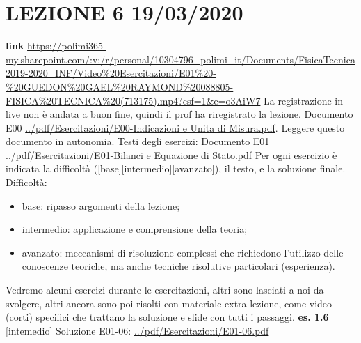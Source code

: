 \section*{LEZIONE 6 19/03/2020}
\textbf{link} \url{https://polimi365-my.sharepoint.com/:v:/r/personal/10304796_polimi_it/Documents/FisicaTecnica2019-2020_INF/Video%20Esercitazioni/E01%20-%20GUEDON%20GAEL%20RAYMOND%20088805-FISICA%20TECNICA%20(713175).mp4?csf=1&e=o3AiW7}\newline
La registrazione in live non è andata a buon fine, quindi il prof ha riregistrato la lezione.\newline
\newline
Documento E00 \url{../pdf/Esercitazioni/E00-Indicazioni e Unita di Misura.pdf}.\newline
Leggere questo documento in autonomia.\newline
\newline
Testi degli esercizi:\newline
Documento E01 \url{../pdf/Esercitazioni/E01-Bilanci e Equazione di Stato.pdf}\newline
Per ogni esercizio è indicata la difficoltà ([base][intermedio][avanzato]), il testo, e la soluzione finale.\newline
Difficoltà:
\begin{itemize}
    \item base: ripasso argomenti della lezione;
    \item intermedio: applicazione e comprensione della teoria;
    \item avanzato: meccanismi di risoluzione complessi che richiedono l'utilizzo delle conoscenze teoriche, ma anche tecniche risolutive particolari (esperienza).
\end{itemize}
Vedremo alcuni esercizi durante le esercitazioni, altri sono lasciati a noi da svolgere, altri ancora sono poi risolti con materiale extra lezione, come video (corti) specifici che trattano la soluzione e slide con tutti i passaggi.\newline
\newline
\textbf{es. 1.6} [intemedio]\newline
Soluzione E01-06: \url{../pdf/Esercitazioni/E01-06.pdf}